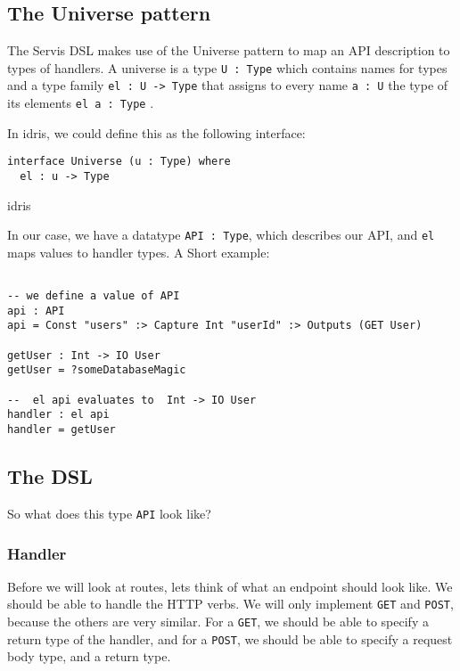 \documentclass[12pt,a4paper]{article}
\begin{document}
\subsection{The Universe pattern}
The Servis DSL makes use of the Universe pattern to map an API description to types of handlers.
 A universe is a type \texttt{U : Type} which contains names for types and a type family \texttt{el : U -> Type} that assigns to every name \texttt{a : U} the type of its elements \texttt{el a : Type} \cite{Altenkirch}\@.

 In idris, we could define this as the following interface:
 \begin{listing}
 \begin{verbatim}
interface Universe (u : Type) where
  el : u -> Type
 \end{verbatim}{idris}
   \caption{Universe interface in Idris}
 \end{listing}

 In our case, we have a datatype \texttt{API : Type}, which describes our API, and \texttt{el} maps values to handler types. A Short example:
 \begin{verbatim}

-- we define a value of API
api : API
api = Const "users" :> Capture Int "userId" :> Outputs (GET User)

getUser : Int -> IO User
getUser = ?someDatabaseMagic

--  el api evaluates to  Int -> IO User
handler : el api
handler = getUser
 \end{verbatim}
\subsection{The DSL}
So what does this type \texttt{API} look like?
\subsubsection{Handler}\label{sec:handler}
Before we will look at routes, lets think of what an endpoint should look like.
We should be able to handle the HTTP verbs. We will only implement \texttt{GET} and \texttt{POST}, because the others are very similar.
For a \texttt{GET}, we should be able to specify a return type of the handler,  and for a \texttt{POST}, we should be able to
specify a request body type, and a return type.
\end{document}
